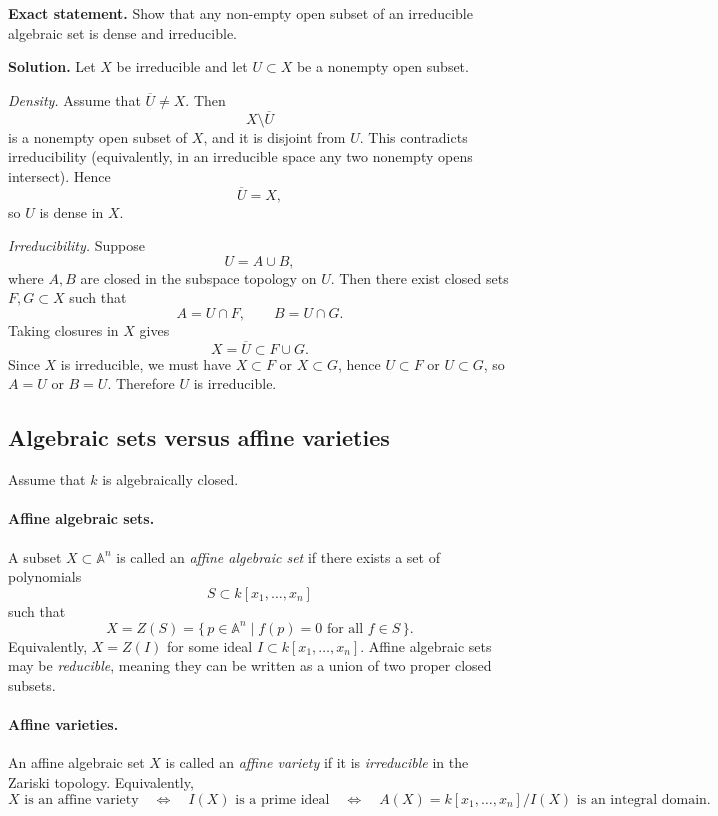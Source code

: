 \documentclass[12pt,a4paper]{article}
\theoremstyle{plain}
\theoremstyle{definition}      %
\begin{document}
\textbf{Exact statement.}
Show that any non-empty open subset of an irreducible algebraic set is dense and irreducible.

\textbf{Solution.}
Let $X$ be irreducible and let $U\subset X$ be a nonempty open subset.

\emph{Density.}
Assume that $\overline{U}\neq X$.
Then
\[
X\setminus \overline{U}
\]
is a nonempty open subset of $X$, and it is disjoint from $U$.
This contradicts irreducibility (equivalently, in an irreducible space any two nonempty opens intersect).
Hence
\[
\overline{U}=X,
\]
so $U$ is dense in $X$.

\emph{Irreducibility.}
Suppose
\[
U
=
A\cup B,
\]
where $A,B$ are closed in the subspace topology on $U$.
Then there exist closed sets $F,G\subset X$ such that
\[
A
=
U\cap F,
\qquad
B
=
U\cap G.
\]
Taking closures in $X$ gives
\[
X
=
\overline{U}
\subset
F\cup G.
\]
Since $X$ is irreducible, we must have $X\subset F$ or $X\subset G$,
hence $U\subset F$ or $U\subset G$,
so $A=U$ or $B=U$.
Therefore $U$ is irreducible.

\subsection*{Algebraic sets versus affine varieties}

Assume that $k$ is algebraically closed.

\paragraph{Affine algebraic sets.}
A subset $X\subset \mathbb A^n$ is called an \emph{affine algebraic set} if there exists a set of polynomials
\[
S\subset k[x_1,\dots,x_n]
\]
such that
\[
X
=
Z(S)
=
\{\,p\in \mathbb A^n \mid f(p)=0 \text{ for all } f\in S\,\}.
\]
Equivalently, $X=Z(I)$ for some ideal $I\subset k[x_1,\dots,x_n]$.
Affine algebraic sets may be \emph{reducible}, meaning they can be written as a union of two proper closed subsets.

\paragraph{Affine varieties.}
An affine algebraic set $X$ is called an \emph{affine variety} if it is \emph{irreducible} in the Zariski topology.
Equivalently,
\[
X \text{ is an affine variety}
\quad\Longleftrightarrow\quad
I(X) \text{ is a prime ideal}
\quad\Longleftrightarrow\quad
A(X)=k[x_1,\dots,x_n]/I(X) \text{ is an integral domain}.
\]
\end{document}
